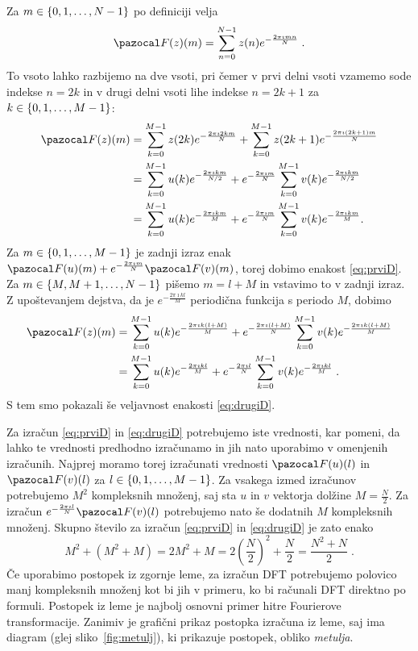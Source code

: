 \begin{dokaz}
Za $m \in \left\{0, 1, \ldots, N-1\right\}$ po definiciji velja
\begin{equation*}
  \F(z)(m) = \sum_{n=0}^{N-1} z(n) e^{-\frac{2\pi\imath mn}{N}} \;.
\end{equation*}
To vsoto lahko razbijemo na dve vsoti, pri čemer v prvi delni vsoti vzamemo sode indekse $n=2k$ in v drugi delni vsoti lihe indekse $n=2k+1$ za $k\in \left\{0, 1, \ldots, M-1\right\}$:
\begin{align*}
  \F(z)(m) & = \sum_{k=0}^{M-1} z(2k)e^{-\frac{2\pi\imath 2km}{N}} + \sum_{k=0}^{M-1} z(2k+1)e^{-\frac{2\pi\imath(2k+1)m}{N}} \\
  & = \sum_{k=0}^{M-1} u(k)e^{-\frac{2\pi\imath km}{N/2}} + e^{-\frac{2\pi \imath m}{N}}\sum_{k=0}^{M-1} v(k)e^{-\frac{2\pi\imath km}{N/2}} \\
  & = \sum_{k=0}^{M-1} u(k)e^{-\frac{2\pi\imath km}{M}} + e^{-\frac{2\pi \imath m}{N}}\sum_{k=0}^{M-1} v(k)e^{-\frac{2\pi\imath km}{M}}.
\end{align*}
Za $m \in \left\{0, 1, \ldots, M-1\right\}$ je zadnji izraz enak $\F(u)(m) + e^{-\frac{2\pi\imath m}{N}} \F(v)(m)$, torej dobimo enakost \eqref{eq:prviD}. Za $m \in \left\{M, M+1, \ldots, N-1\right\}$ pišemo $m = l + M$ in vstavimo to v zadnji izraz. Z upoštevanjem dejstva, da je $e^{-\frac{2\pi\imath kl}{M}}$ periodična funkcija s periodo $M$, dobimo
\begin{align*}
  \F(z)(m) & = \sum_{k=0}^{M-1} u(k)e^{-\frac{2\pi\imath k(l + M)}{M}} + e^{-\frac{2\pi \imath (l + M)}{N}}\sum_{k=0}^{M-1} v(k)e^{-\frac{2\pi\imath k(l + M)}{M}} \\
  & = \sum_{k=0}^{M-1} u(k)e^{-\frac{2\pi\imath kl}{M}} + e^{-\frac{2\pi \imath l}{N}}\sum_{k=0}^{M-1} v(k)e^{-\frac{2\pi\imath kl}{M}} \;.
\end{align*}
S tem smo pokazali še veljavnost enakosti \eqref{eq:drugiD}.
\end{dokaz}
%
Za izračun \eqref{eq:prviD} in \eqref{eq:drugiD} potrebujemo iste vrednosti, kar pomeni, da lahko te vrednosti predhodno izračunamo in jih nato uporabimo v omenjenih izračunih. Najprej moramo torej izračunati vrednosti $\F(u)(l)$ in $\F(v)(l)$ za $l \in \left\{0, 1, \ldots, M-1\right\}$. Za vsakega izmed izračunov potrebujemo $M^2$ kompleksnih množenj, saj sta $u$ in $v$ vektorja dolžine $M = \frac{N}{2}$. Za izračun $e^{-\frac{2\pi\imath l}{N}} \F(v)(l)$ potrebujemo nato še dodatnih $M$ kompleksnih množenj. Skupno število za izračun \eqref{eq:prviD} in \eqref{eq:drugiD} je zato enako
$$M^2 + (M^2 + M) = 2M^2 + M = 2 \left(\frac{N}{2}\right)^2 + \frac{N}{2} = \frac{N^2 + N}{2} \;.$$
Če uporabimo postopek iz zgornje leme, za izračun DFT potrebujemo polovico manj kompleksnih množenj kot bi jih v primeru, ko bi računali DFT direktno po formuli. Postopek iz leme je najbolj osnovni primer hitre Fourierove transformacije. Zanimiv je grafični prikaz postopka izračuna iz leme, saj ima diagram (glej sliko~\ref{fig:metulj}), ki prikazuje postopek, obliko \emph{metulja}.

